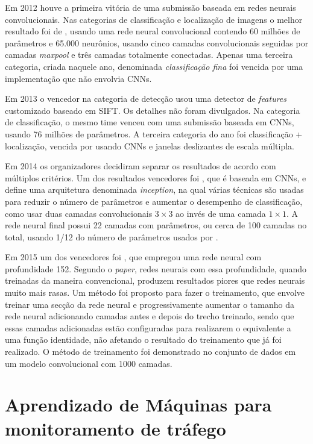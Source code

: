 Em 2012 houve a primeira vitória de uma submissão baseada em redes neurais
convolucionais. Nas categorias de classificação e localização de imagens o
melhor resultado foi de , usando uma
rede neural convolucional contendo 60 milhões de parâmetros e 65.000
neurônios, usando cinco camadas
convolucionais seguidas por camadas \emph{maxpool} e três camadas totalmente
conectadas. Apenas uma terceira categoria, criada naquele ano, denominada
\emph{classificação fina} foi vencida por uma implementação que não envolvia
CNNs.

Em 2013 o vencedor na categoria de detecção usou uma detector de
\emph{features}
customizado baseado em SIFT. Os detalhes não foram divulgados. Na categoria de
classificação, o mesmo time venceu com uma submissão baseada em CNNs, usando
76 milhões de parâmetros. A terceira categoria do ano foi classificação +
localização, vencida por  usando CNNs e
janelas deslizantes de escala múltipla.

Em 2014 os organizadores decidiram separar os resultados de acordo com
múltiplos critérios. Um dos resultados vencedores foi
, que é baseada em CNNs, e define uma arquitetura
denominada \emph{inception}, na qual várias técnicas são usadas para reduzir o
número de parâmetros e aumentar o desempenho de classificação, como usar
duas camadas convolucionais $3 \times 3$ ao invés de uma camada $1 \times 1$. A
rede neural final possui 22 camadas com parâmetros, ou cerca de 100 camadas no
total, usando 1/12 do número de parâmetros usados por
.

Em 2015 um dos vencedores foi , que empregou uma rede
neural com profundidade 152. Segundo o \emph{paper}, redes neurais com essa
profundidade,
quando treinadas da maneira convencional, produzem resultados piores que redes
neurais muito mais rasas. Um método foi proposto para fazer o treinamento, que
envolve treinar uma secção da rede neural e progressivamente aumentar o tamanho
da rede neural adicionando camadas antes e depois do trecho treinado, sendo que
essas camadas adicionadas estão configuradas para realizarem o equivalente a
uma função identidade, não afetando o resultado do treinamento que já foi
realizado. O método de treinamento foi demonstrado no conjunto de dados
 em um modelo
convolucional com 1000 camadas.

\section{Aprendizado de Máquinas para monitoramento de tráfego}
	\label{sec:cap3_ml_trafego}


